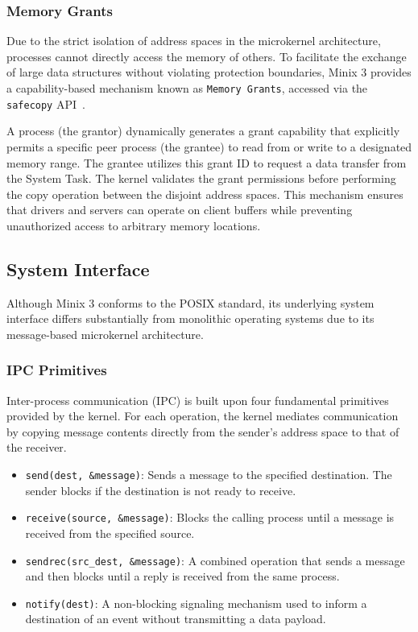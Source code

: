 \documentclass[a4paper,10pt,twoside]{report}
\theoremstyle{definition}
\begin{document}
\subsubsection{Memory Grants}
Due to the strict isolation of address spaces in the microkernel architecture, processes cannot directly access the memory of others. To facilitate the exchange of large data structures without violating protection boundaries, Minix 3 provides a capability-based mechanism known as \texttt{Memory Grants}, accessed via the \texttt{safecopy} API~\cite{minix_safecopy}.

A process (the grantor) dynamically generates a grant capability that explicitly permits a specific peer process (the grantee) to read from or write to a designated memory range. The grantee utilizes this grant ID to request a data transfer from the System Task. The kernel validates the grant permissions before performing the copy operation between the disjoint address spaces. This mechanism ensures that drivers and servers can operate on client buffers while preventing unauthorized access to arbitrary memory locations.

\subsection{System Interface}
Although Minix 3 conforms to the POSIX standard, its underlying system interface differs substantially from monolithic operating systems due to its message-based microkernel architecture.

\subsubsection{IPC Primitives}
Inter-process communication (IPC) is built upon four fundamental primitives provided by the kernel. For each operation, the kernel mediates communication by copying message contents directly from the sender's address space to that of the receiver.
\begin{itemize}
    \item \texttt{send(dest, \&message)}: Sends a message to the specified destination. The sender blocks if the destination is not ready to receive.
    \item \texttt{receive(source, \&message)}: Blocks the calling process until a message is received from the specified source.
    \item \texttt{sendrec(src\_dest, \&message)}: A combined operation that sends a message and then blocks until a reply is received from the same process.
    \item \texttt{notify(dest)}: A non-blocking signaling mechanism used to inform a destination of an event without transmitting a data payload.
\end{itemize}
\end{document}
